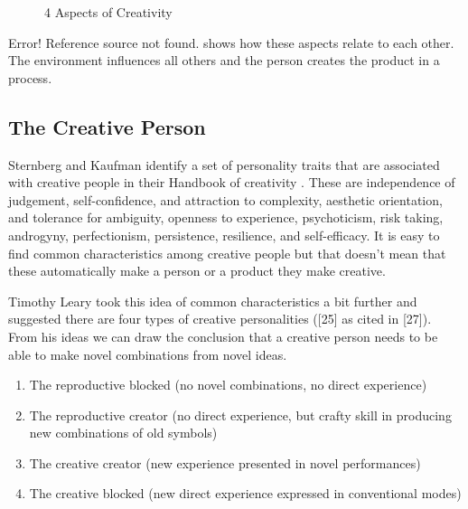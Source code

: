 \begin{figure}[!htb] %
  \centering
  \tikzset{every fit/.append style=text badly centered}
  \caption[4 Aspects of Creativity]{4 Aspects of Creativity}
  \label{fig:4Crea}
\end{figure}

Error! Reference source not found. shows how these aspects relate to each other. The environment influences all others and the person creates the product in a process.

\subsection{The Creative Person}

Sternberg and Kaufman identify a set of personality traits that are associated with creative people in their Handbook of creativity \citep{Sternberg1988, Sternberg1999}. These are independence of judgement, self-confidence, and attraction to complexity, aesthetic orientation, and tolerance for ambiguity, openness to experience, psychoticism, risk taking, androgyny, perfectionism, persistence, resilience, and self-efficacy. It is easy to find common characteristics among creative people but that doesn't mean that these automatically make a person or a product they make creative.

Timothy Leary took this idea of common characteristics a bit further and suggested there are four types of creative personalities (\citep{}[25] as cited in [27]). From his ideas we can draw the conclusion that a creative person needs to be able to make novel combinations from novel ideas.

\begin{enumerate}
  \item The reproductive blocked (no novel combinations, no direct experience)
  \item The reproductive creator (no direct experience, but crafty skill in producing new combinations of old symbols)
  \item The creative creator (new experience presented in novel performances)
  \item The creative blocked (new direct experience expressed in conventional modes)
\end{enumerate}

